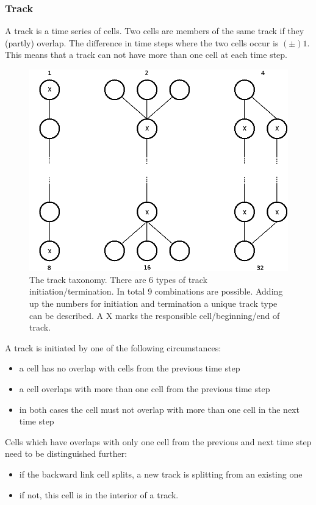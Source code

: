 \documentclass{scrartcl}
\begin{document}
\subsubsection*{Track}
A track is a time series of cells. Two cells are members of the same track if they (partly) overlap. The difference in time steps where the two cells occur is $(\pm)1$. This means that a track can not have more than one cell at each time step. 
\begin{figure}[h]
	\centering
	\includegraphics[width=.8\linewidth]{trackinitterm}
	\caption{The track taxonomy. There are 6 types of track initiation/termination. In total 9 combinations are possible. Adding up the numbers for initiation and termination a unique track type can be described. A X marks the responsible cell/beginning/end of track.}
	\label{trackinitterm}
\end{figure}
A track is initiated by one of the following circumstances:
\begin{itemize}
	\item a cell has no overlap with cells from the previous time step
	\item a cell overlaps with more than one cell from the previous time step
	\item in both cases the cell must not overlap with more than one cell in the next time step
\end{itemize}
Cells which have overlaps with only one cell from the previous and next time step need to be distinguished further:
\begin{itemize}
	\item if the backward link cell splits, a new track is splitting from an existing one
	\item if not, this cell is in the interior of a track.
\end{itemize}
\end{document}
